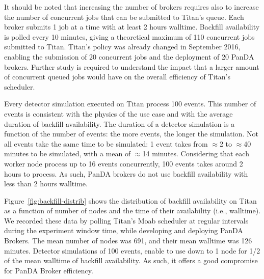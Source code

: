 It should be noted that increasing the number of brokers requires also to
increase the number of concurrent jobs that can be submitted to Titan's queue.
Each broker submits 1 job at a time with at least 2 hours walltime. Backfill
availability is polled every 10 minutes, giving a theoretical maximum of 110
concurrent jobs submitted to Titan. Titan's policy was already changed in
September 2016, enabling the submission of 20 concurrent jobs and the deployment
of 20 PanDA brokers. Further study is required to understand the impact that a
larger amount of concurrent queued jobs would have on the overall efficiency of
Titan's scheduler. 

Every detector simulation executed on Titan process 100 events. This number of
events is consistent with the physics of the use case and with the average
duration of backfill availability. The duration of a detector simulation is a
function of the number of events: the more events, the longer the simulation.
Not all events take the same time to be simulated:
1 event takes from $\approx$2 to $\approx$40 minutes to be simulated, with a
mean of $\approx$14 minutes. Considering that each worker node process up to 16
events concurrently, 100 events takes around 2 hours to process. As such, PanDA brokers do not use backfill availability with less than 2 hours walltime.


Figure~\ref{fig:backfill-distrib} shows the distribution of backfill
availability on Titan as a function of number of nodes and the time of their
availability (i.e., walltime). We recorded these data by polling Titan's Moab
scheduler at regular intervals during the experiment window time, while
developing and deploying PanDA Brokers. The mean number of nodes was 691, and
their mean walltime was 126 minutes. Detector simulations of 100 events, enable
to use down to 1 node for 1/2 of the mean walltime of backfill availability. As
such, it offers a good compromise for PanDA Broker efficiency.

